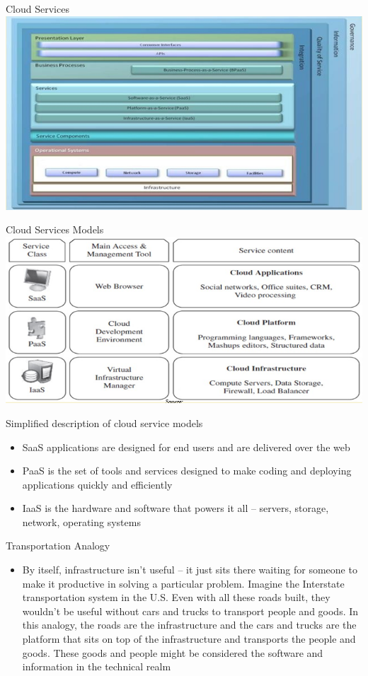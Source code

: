 \documentclass{SKP-beamer}
\begin{document}
\begin{frame}{Cloud Services}
	\includegraphics[scale=0.7]{t.png}
\end{frame}

\begin{frame}{Cloud Services Models}
	\includegraphics[scale=0.7]{u.png}
\end{frame}

\begin{frame}{Simplified description of cloud service models}
	\begin{itemize}
		\item SaaS applications are designed for end users and are delivered over the web
		\item PaaS is the set of tools and services designed to make coding and deploying applications quickly and efficiently
		\item IaaS is the hardware and software that powers it all – servers, storage, network, operating systems
	\end{itemize}
\end{frame} 

\begin{frame}{Transportation Analogy}
	\begin{itemize}
		\item By itself, infrastructure isn’t useful – it just sits there waiting for someone to make it productive in solving a particular problem. Imagine the Interstate transportation system in
		the U.S. Even with all these roads built, they wouldn’t be
		useful without cars and trucks to transport people and goods. In this analogy, the roads are the infrastructure and the cars and trucks are the platform that sits on top of the infrastructure and transports the people and goods. These goods and people might be considered the software and information in the technical realm
	\end{itemize}
\end{frame}
\end{document}
